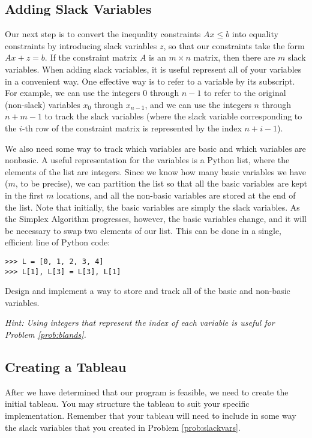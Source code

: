 \subsection{Adding Slack Variables}
Our next step is to convert the inequality constraints $Ax \leq b$ into equality constraints
by introducing slack variables $z$, so that our constraints take the form $Ax + z = b$.
If the constraint matrix $A$ is an $m \times n$ matrix, then there are $m$ slack variables.
When adding slack variables, it is useful represent all of your variables in a convenient way.
One effective way is to refer to a variable by its subscript.
For example, we can use the integers $0$ through $n-1$ to refer to the original (non-slack) variables $x_0$ through
$x_{n-1}$, and we can use the integers $n$ through $n+m-1$ to track the slack variables (where the slack variable
corresponding to the $i$-th row of the constraint matrix is represented by the index $n+i-1$).

We also need some way to track which variables are basic and which variables are nonbasic.
A useful representation for the variables is a Python list, where the elements of the list are integers.
Since we know how many basic variables we have ($m$, to be precise), we can partition the list so that all the basic
variables are kept in the first $m$ locations, and all the non-basic variables are stored at the end of the list.
Note that initially, the basic variables are simply the slack variables.
As the Simplex Algorithm progresses, however, the basic variables change, and it will be necessary to swap two
elements of our list. This can be done in a single, efficient line of Python code:
\begin{lstlisting}
>>> L = [0, 1, 2, 3, 4]
>>> L[1], L[3] = L[3], L[1]
\end{lstlisting}

\begin{problem}
Design and implement a way to store and track all of the basic and non-basic variables.

\emph{Hint: Using integers that represent the index of each variable is useful for Problem \ref{prob:blands}.}
\label{prob:slackvars}
\end{problem}

\subsection{Creating a Tableau}
After we have determined that our program is feasible, we need to create the initial tableau.
You may structure the tableau to suit your specific implementation.
Remember that your tableau will need to include in some way the slack variables that you created in Problem \ref{prob:slackvars}.

